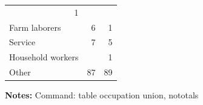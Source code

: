 \documentclass{article}
\begin{document}
\begin{table}[htbp]
\begin{threeparttable}
\begin{tabular}{lll}
  \multicolumn{1}{r}{1} &
  \multicolumn{1}{r}{} \\
\multicolumn{1}{l}{\hspace{1em}Farm laborers} &
  \multicolumn{1}{r}{6} &
  \multicolumn{1}{r}{1} \\
\multicolumn{1}{l}{\hspace{1em}Service} &
  \multicolumn{1}{r}{7} &
  \multicolumn{1}{r}{5} \\
\multicolumn{1}{l}{\hspace{1em}Household workers} &
  \multicolumn{1}{r}{} &
  \multicolumn{1}{r}{1} \\
\multicolumn{1}{l}{\hspace{1em}Other} &
  \multicolumn{1}{r}{87} &
  \multicolumn{1}{r}{89} \\
\bottomrule
\end{tabular}

 \footnotesize  
\textbf{Notes:} Command: table occupation union, nototals 
\end{threeparttable} 
\end{table}
\end{document}

